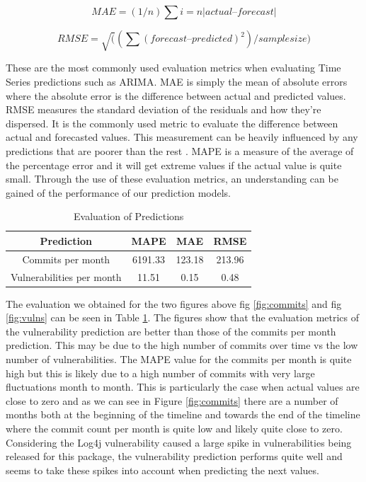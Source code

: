 \documentclass[conference]{IEEEtran}
\begin{document}
{\[ MAE = (1/n) \sum{i=n} |actual – forecast|  \]

\[ RMSE = \sqrt( (\sum (forecast – predicted) ^ 2) / sample size )  \]


These are the most commonly used evaluation metrics when evaluating Time Series predictions such as ARIMA. MAE is simply the mean of absolute errors where the absolute error is the difference between actual and predicted values. RMSE measures the standard deviation of the residuals and how they're dispersed. It is the commonly used metric to evaluate the difference between actual and forecasted values. This measurement can be heavily influenced by any predictions that are poorer than the rest \cite{f_abdulhafidh_dael_performance_2022}. MAPE is a measure of the average of the percentage error and it will get extreme values if the actual value is quite small. Through the use of these evaluation metrics, an understanding can be gained of the performance of our prediction models. 

\begin{table}
 \caption{Evaluation of Predictions}
\label{evaluations}
\begin{center}
\begin{tabular}{|c|c|c|c|}
\hline
    \textbf{Prediction} & \textbf{MAPE} & \textbf{MAE} & \textbf{RMSE} \\ \hline
    Commits per month & 6191.33 & 123.18 & 213.96 \\ \hline
    Vulnerabilities per month & 11.51 & 0.15 & 0.48 \\ \hline
\end{tabular}
\end{center}
\end{table}

The evaluation we obtained for the two figures above fig \ref{fig:commits} and fig \ref{fig:vulns} can be seen in Table \ref{evaluations}. The figures show that the evaluation metrics of the vulnerability prediction are better than those of the commits per month prediction. This may be due to the high number of commits over time vs the low number of vulnerabilities. The MAPE value for the commits per month is quite high but this is likely due to a high number of commits with very large fluctuations month to month. This is particularly the case when actual values are close to zero and as we can see in Figure \ref{fig:commits} there are a number of months both at the beginning of the timeline and towards the end of the timeline where the commit count per month is quite low and likely quite close to zero. Considering the Log4j vulnerability caused a large spike in vulnerabilities being released for this package, the vulnerability prediction performs quite well and seems to take these spikes into account when predicting the next values. 

}
\end{document}
